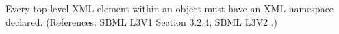 Every top-level XML element within an \Annotation object must have an XML
namespace declared.  (References: SBML L3V1 Section 3.2.4; SBML L3V2 .)
